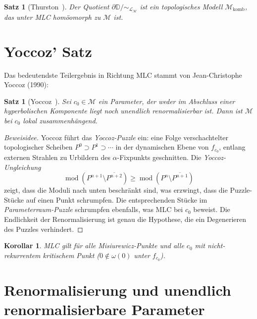 \documentclass[12pt,a4paper]{amsart}
\newtheorem{satz}[theorem]{Satz}
\newtheorem{korollar}[theorem]{Korollar}
\theoremstyle{definition}
\theoremstyle{remark}
\DeclareMathOperator{\Mod}{mod}
\begin{document}
\begin{satz}[Thurston~\cite{Thurston1985}]
Der Quotient $\partial \mathbb{D} / \sim_{\mathcal{L}_{\mathcal{M}}}$
ist ein topologisches Modell $\mathcal{M}_{\mathrm{komb}}$, das unter
MLC homöomorph zu $\mathcal{M}$ ist.
\end{satz}

\section{Yoccoz' Satz}

Das bedeutendste Teilergebnis in Richtung MLC stammt von
Jean-Christophe Yoccoz (1990):

\begin{satz}[Yoccoz~\cite{HubbardSchleicher1994}]
\label{satz:Yoccoz}
Sei $c_0 \in \mathcal{M}$ ein Parameter, der weder im Abschluss einer
hyperbolischen Komponente liegt noch unendlich renormalisierbar ist.
Dann ist $\mathcal{M}$ bei $c_0$ lokal zusammenhängend.
\end{satz}

\begin{proof}[Beweisidee]
Yoccoz führt das \emph{Yoccoz-Puzzle} ein: eine Folge verschachtelter
topologischer Scheiben $P^0 \supset P^1 \supset \cdots$ in der dynamischen
Ebene von $f_{c_0}$, entlang externen Strahlen zu Urbildern des
$\alpha$-Fixpunkts geschnitten. Die \emph{Yoccoz-Ungleichung}
\[
    \Mod(P^{n+1} \setminus \overline{P^{n+2}}) \geq
    \Mod(P^n \setminus \overline{P^{n+1}})
\]
zeigt, dass die Moduli nach unten beschränkt sind, was erzwingt, dass die
Puzzle-Stücke auf einen Punkt schrumpfen. Die entsprechenden Stücke im
\emph{Parameterraum-Puzzle} schrumpfen ebenfalls, was MLC bei $c_0$ beweist.
Die Endlichkeit der Renormalisierung ist genau die Hypothese, die ein
Degenerieren des Puzzles verhindert.
\end{proof}

\begin{korollar}
MLC gilt für alle Misiurewicz-Punkte und alle $c_0$ mit nicht-rekurrentem
kritischem Punkt ($0 \notin \omega(0)$ unter $f_{c_0}$).
\end{korollar}

\section{Renormalisierung und unendlich renormalisierbare Parameter}
\end{document}
